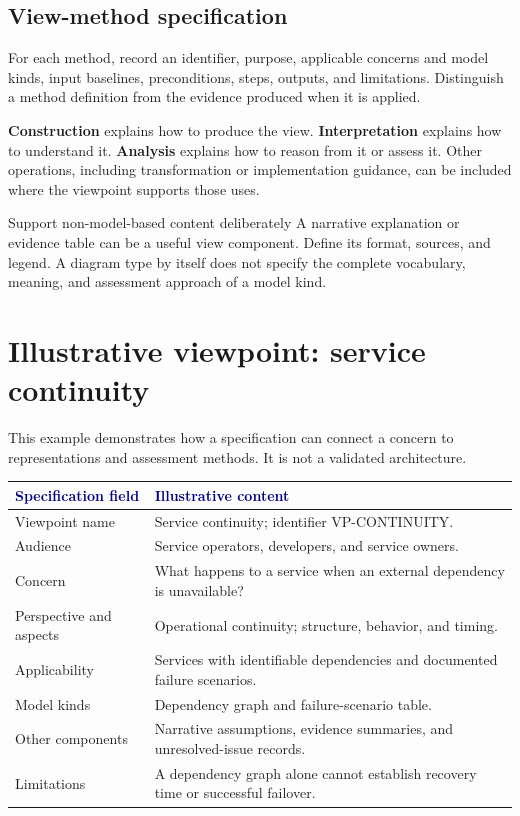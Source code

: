 \documentclass[11pt,letterpaper]{article}
\newcommand{\TemplatePageBreak}{\clearpage}
\newcommand{\TableHead}[1]{\textcolor{Navy}{\sffamily\bfseries#1}}
\newcommand{\Lead}[1]{\textcolor{Muted}{#1}\par\vspace{3pt}}
\begin{document}
\subsection{View-method specification}
For each method, record an identifier, purpose, applicable concerns and model
kinds, input baselines, preconditions, steps, outputs, and limitations. Distinguish
a method definition from the evidence produced when it is applied.

\textbf{Construction} explains how to produce the view.
\textbf{Interpretation} explains how to understand it.
\textbf{Analysis} explains how to reason from it or assess it.
Other operations, including transformation or implementation guidance, can be
included where the viewpoint supports those uses.

\begin{TemplateNote}{Support non-model-based content deliberately}
\small
A narrative explanation or evidence table can be a useful view component.
Define its format, sources, and legend. A diagram type by itself does not specify
the complete vocabulary, meaning, and assessment approach of a model kind.
\end{TemplateNote}

\TemplatePageBreak
\section{Illustrative viewpoint: service continuity}
\Lead{This example demonstrates how a specification can connect a concern to
representations and assessment methods. It is not a validated architecture.}

{\small
\begin{tabularx}{\linewidth}{@{}L{1.38in}Y@{}}
\toprule
\TableHead{Specification field} & \TableHead{Illustrative content}\\
\midrule
Viewpoint name & Service continuity; identifier VP-CONTINUITY.\\
Audience & Service operators, developers, and service owners.\\
Concern & What happens to a service when an external dependency is unavailable?\\
Perspective and aspects & Operational continuity; structure, behavior, and timing.\\
Applicability & Services with identifiable dependencies and documented failure scenarios.\\
Model kinds & Dependency graph and failure-scenario table.\\
Other components & Narrative assumptions, evidence summaries, and unresolved-issue records.\\
Limitations & A dependency graph alone cannot establish recovery time or successful failover.\\
\bottomrule
\end{tabularx}}
\end{document}
